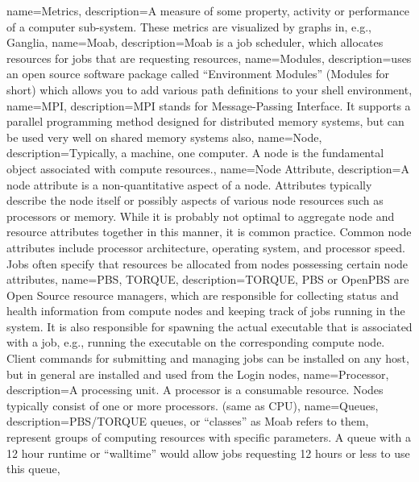 {
  name={Metrics},
  description={A measure of some property, activity or performance of a computer sub-system. These metrics are visualized by graphs in, e.g., Ganglia},
}
{
  name={Moab},
  description={Moab is a job scheduler, which allocates resources for jobs that are requesting resources},
}
{
  name={Modules},
  description={\hpc uses an open source software package called ``Environment Modules'' (Modules for short) which allows you to add various path definitions to your shell environment},
}
{
  name={MPI},
  description={MPI stands for Message-Passing Interface. It supports a parallel programming method designed for distributed memory systems, but can be used very well on shared memory systems also},
}
{
  name={Node},
  description={Typically, a machine, one computer. A node is the fundamental object associated with compute resources.},
}
{
  name={Node Attribute},
  description={A node attribute is a non-quantitative aspect of a node. Attributes typically describe the node itself or possibly aspects of various node resources such as processors or memory. While it is probably not optimal to aggregate node and resource attributes together in this manner, it is common practice. Common node attributes include processor architecture, operating system, and processor speed. Jobs often specify that resources be allocated from nodes possessing certain node attributes},
}
{
  name={PBS, TORQUE},
  description={TORQUE, PBS or OpenPBS are Open Source resource managers, which are responsible for collecting status and health information from compute nodes and keeping track of jobs running in the system. It is also responsible for spawning the actual executable that is associated with a job, e.g., running the executable on the corresponding compute node. Client commands for submitting and managing jobs can be installed on any host, but in general are installed and used from the Login nodes},
}
{
  name={Processor},
  description={A processing unit. A processor is a consumable resource. Nodes typically consist of one or more processors. (same as CPU)},
}
{
  name={Queues},
  description={PBS/TORQUE queues, or ``classes'' as Moab refers to them, represent groups of computing resources with specific parameters. A queue with a 12 hour runtime or ``walltime'' would allow jobs requesting 12 hours or less to use this queue},
}
